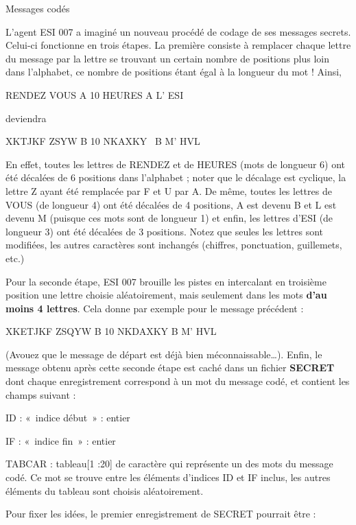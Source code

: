 \begin{Exercice}{Messages codés}

{
L'agent ESI 007 a imaginé un nouveau procédé de codage
de ses messages secrets. Celui-ci fonctionne en trois étapes. La
première consiste à remplacer chaque lettre du message par la lettre se
trouvant un certain nombre de positions plus loin dans l’alphabet, ce
nombre de positions étant égal à la longueur du mot ! Ainsi,}

{\centering
RENDEZ VOUS A 10 HEURES A L’ ESI
\par}

{
deviendra}

{\centering
XKTJKF ZSYW B 10 NKAXKY \ B M’ HVL
\par}

{
En effet, toutes les lettres de RENDEZ et de HEURES (mots de longueur 6)
ont été décalées de 6 positions dans l’alphabet ; noter que le décalage
est cyclique, la lettre Z ayant été remplacée par F et U par A. De
même, toutes les lettres de VOUS (de longueur 4) ont été décalées de 4
positions, A est devenu B et L est devenu M (puisque ces mots sont de
longueur 1) et enfin, les lettres d’ESI (de longueur 3) ont été
décalées de 3 positions. Notez que seules les lettres sont modifiées,
les autres caractères sont inchangés (chiffres, ponctuation,
guillemets, etc.)}

{
Pour la seconde étape, ESI 007 brouille les pistes en intercalant en
troisième position une lettre choisie aléatoirement, mais seulement
dans les mots \textbf{d’au moins 4 lettres}. Cela donne par exemple
pour le message précédent :}

{\centering
XKETJKF ZSQYW B 10 NKDAXKY B M’ HVL
\par}

{
(Avouez que le message de départ est déjà bien méconnaissable…). Enfin,
le message obtenu après cette seconde étape est caché dans un fichier
\textbf{SECRET} dont chaque enregistrement correspond à un mot du
message codé, et contient les champs suivant :}

\begin{liste}
\item {
ID : «~indice début~» : entier}
\item {
IF : «~indice fin~» : entier}
\item {
TABCAR : tableau[1 :20] de caractère qui représente un des mots du
message codé. Ce mot se trouve entre les éléments d’indices ID et IF
inclus, les autres éléments du tableau sont choisis aléatoirement.}
\end{liste}
{
Pour fixer les idées, le premier enregistrement de SECRET pourrait être
:}


\end{Exercice}

